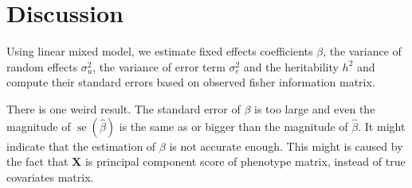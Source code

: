 \documentclass{article}
\newcommand{\se}[1]{\operatorname{se}(#1)}
\begin{document}
\section{Discussion}
Using linear mixed model, we estimate fixed effects coefficients $ \beta $, the variance of random effects $ \sigma^{2}_{u} $, the variance of error term $ \sigma^{2}_{e} $ and the heritability $ h^{2} $ and compute their standard errors based on observed fisher information matrix.

There is one weird result. The standard error of $ \beta $ is too large and even the magnitude of $ \se{\hat{\beta}} $ is the same as or bigger than the magnitude of $ \hat{\beta} $. It might indicate that the estimation of $ \beta $ is not accurate enough. This might is caused by the fact that $ \mathbf{X} $ is principal component score of phenotype matrix, instead of true covariates matrix. 
\end{document}
